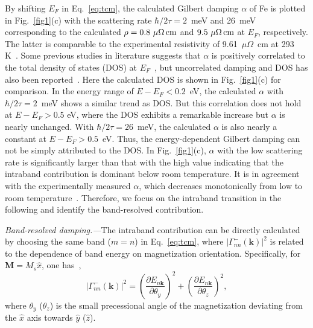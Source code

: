 \documentclass[prl,aps,twocolumn,showpacs,citeautoscript,reprint,superscriptaddress]{revtex4-1}
\begin{document}
By shifting $E_F$ in Eq.~\eqref{eq:tcm}, the calculated Gilbert damping $\alpha$ of Fe is plotted in Fig.~\ref{fig1}(c) with the scattering rate $\hbar/2\tau=2$~meV and 26~meV corresponding to the calculated $\rho=0.8~\mu\Omega\,{\rm cm}$ and $9.5~\mu\Omega\,{\rm cm}$ at $E_F$, respectively. The latter is comparable to the experimental resistivity of 9.61~$\mu\Omega$~cm at 293 K~\cite{Ho:JPS83}. Some previous studies in literature suggests that $\alpha$ is positively correlated to the total density of states (DOS) at $E_F$~\cite{Schoen:NP16,Chen:natphys18,Chen:prl23,Xu:prb19}, but uncorrelated damping and DOS has also been reported~\cite{Hou:prapplied19,Jiang:prb24,Bera:arxiv24}. Here the calculated DOS is shown in Fig.~\ref{fig1}(c) for comparison. In the energy range of $E-E_F<0.2$~eV, the calculated $\alpha$ with $\hbar/2\tau=2$~meV shows a similar trend as DOS. But this correlation does not hold at $E-E_F>0.5$ eV, where the DOS exhibits a remarkable increase but $\alpha$ is nearly unchanged. With $\hbar/2\tau=26$~meV, the calculated $\alpha$ is also nearly a constant at $E-E_F>0.5$~eV. Thus, the energy-dependent Gilbert damping can not be simply attributed to the DOS. In Fig.~\ref{fig1}(c), $\alpha$ with the low scattering rate is significantly larger than that with the high value indicating that the intraband contribution is dominant below room temperature. It is in agreement with the experimentally measured $\alpha$, which decreases monotonically from low to room temperature~\cite{Khodadadi:prl20}. Therefore, we focus on the intraband transition in the following and identify the band-resolved contribution.

{\it\color{red}Band-resolved damping.---}The intraband contribution can be directly calculated by choosing the same band ($m=n$) in Eq.~\eqref{eq:tcm}, where $\vert\Gamma_{nn}^{-}(\mathbf k)\vert^2$ is related to the dependence of band energy on magnetization orientation. Specifically, for $\mathbf{M}=M_s\hat x$, one has~\cite{Gilmore:JAP08},
\begin{equation}
\vert\Gamma_{nn}^{-}(\mathbf k)\vert^2={\left(\frac{\partial E_{n\mathbf k}}{\partial \theta_y} \right)}^2+{\left( \frac{\partial E_{n\mathbf k}}{\partial \theta_z} \right)}^2,\label{eq:Gamma}
\end{equation}	
where $\theta_{y}$ ($\theta_{z}$) is the small precessional angle of the magnetization deviating from the $\hat x$ axis towards $\hat y$ ($\hat z$). 
\end{document}
